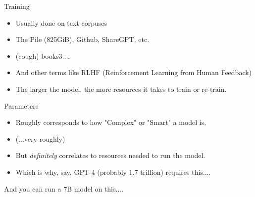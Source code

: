 \documentclass{beamer}
\begin{document}
\begin{frame}{Training}
	\begin{itemize}
		\item Usually done on text corpuses
		\pause
		\item The Pile (825GiB), Github, ShareGPT, etc.
		\pause
		\item (cough) books3....
		\pause
		\item And other terms like RLHF (Reinforcement Learning from Human Feedback)
		\pause
		\item The larger the model, the more resources it takes to train or re-train.
	\end{itemize}
\end{frame}

\begin{frame}{Parameters}
	\begin{itemize}
		\item Roughly corresponds to how "Complex" or "Smart" a model is.
		\pause
		\item (...very roughly)
		\pause 
		\item But \textit{definitely} correlates to resources needed to run the model.
		\pause
		\item Which is why, say, GPT-4 (probably 1.7 trillion) requires this....
	\end{itemize}
\end{frame}

\begin{frame}[plain]
\end{frame}

\begin{frame}
	And you can run a 7B model on this....
\end{frame}
\end{document}
